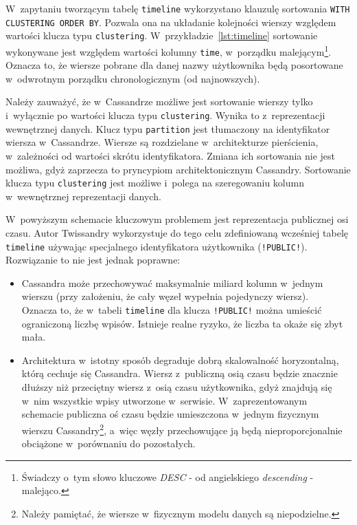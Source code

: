 W~zapytaniu tworzącym tabelę \verb+timeline+ wykorzystano klauzulę sortowania \verb+WITH CLUSTERING ORDER BY+. Pozwala ona na układanie kolejności wierszy względem wartości klucza typu \verb+clustering+. W~przykładzie~\ref{lst:timeline} sortowanie wykonywane jest względem wartości kolumny \verb+time+, w~porządku malejącym\footnote{Świadczy o~tym słowo kluczowe \emph{DESC} - od angielskiego \emph{descending} - malejąco.}. Oznacza to, że wiersze pobrane dla danej nazwy użytkownika będą posortowane w~odwrotnym porządku chronologicznym (od najnowszych).

Należy zauważyć, że w~Cassandrze możliwe jest sortowanie wierszy tylko i~wyłącznie po wartości klucza typu \verb+clustering+. Wynika to z~reprezentacji wewnętrznej danych. Klucz typu \verb+partition+ jest tłumaczony na identyfikator wiersza w~Cassandrze. Wiersze są rozdzielane w~architekturze pierścienia, w~zależności od wartości skrótu identyfikatora. Zmiana ich sortowania nie jest możliwa, gdyż zaprzecza to pryncypiom architektonicznym Cassandry. Sortowanie klucza typu \verb+clustering+ jest możliwe i~polega na szeregowaniu kolumn w~wewnętrznej reprezentacji danych.

W~powyższym schemacie kluczowym problemem jest reprezentacja publicznej osi czasu. Autor Twissandry wykorzystuje do tego celu zdefiniowaną wcześniej tabelę \verb+timeline+ używając specjalnego identyfikatora użytkownika (\verb+!PUBLIC!+). Rozwiązanie to nie jest jednak poprawne:

\begin{itemize}
	\item Cassandra może przechowywać maksymalnie miliard kolumn w~jednym wierszu (przy założeniu, że cały węzeł wypełnia pojedynczy wiersz).~\cite{cassandra_limitations} Oznacza to, że w~tabeli \verb+timeline+ dla klucza \verb+!PUBLIC!+ można umieścić ograniczoną liczbę wpisów. Istnieje realne ryzyko, że liczba ta okaże się zbyt mała.
	\item Architektura w~istotny sposób degraduje dobrą skalowalność horyzontalną, którą cechuje się Cassandra. Wiersz z~publiczną osią czasu będzie znacznie dłuższy niż przeciętny wiersz z~osią czasu użytkownika, gdyż znajdują się w~nim wszystkie wpisy utworzone w~serwisie. W~zaprezentowanym schemacie publiczna oś czasu będzie umieszczona w~jednym fizycznym wierszu Cassandry\footnote{Należy pamiętać, że wiersze w~fizycznym modelu danych są niepodzielne.}, a~więc węzły przechowujące ją będą nieproporcjonalnie obciążone w~porównaniu do pozostałych.
\end{itemize}

